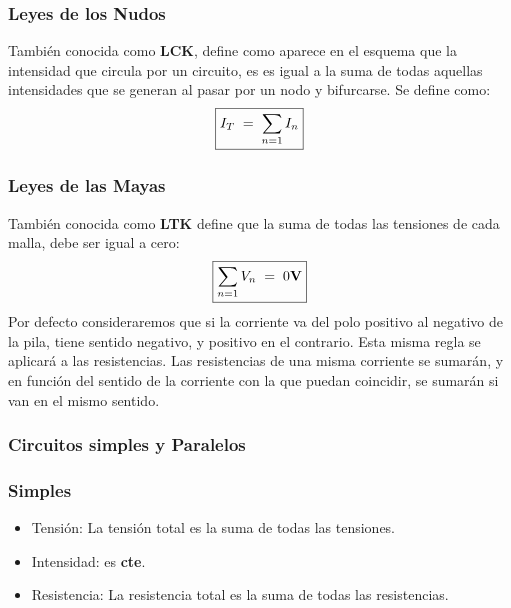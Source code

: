\subsubsection{Leyes de los Nudos}
\begin{wrapfigure}{r}{3cm}
\end{wrapfigure}
\noindent También conocida como \textbf{LCK}, define como aparece en el esquema que la intensidad que circula por un circuito, es es igual a la suma de todas aquellas intensidades que se generan al pasar por un nodo y bifurcarse. Se define como:
\[
        \boxed{I_T \hspace{1mm} = \hspace{1mm} \sum_{n=1}I_n}
\]
\subsubsection{Leyes de las Mayas}
\noindent También conocida como \textbf{LTK} define que la suma de todas las tensiones de cada malla, debe ser igual a cero:
\[
        \boxed{\sum_{n=1}V_n \hspace{1mm} = \hspace{1mm} 0\textnormal{\textbf{V}}}
\]
\noindent Por defecto consideraremos que si la corriente va del polo positivo al negativo de la pila, tiene sentido negativo, y positivo en el contrario. Esta misma regla se aplicará a las resistencias.
Las resistencias de una misma corriente se sumarán, y en función del sentido de la corriente con la que puedan coincidir, se sumarán si van en el mismo sentido.
\subsubsection{Circuitos simples y Paralelos}
\subsubsection{Simples}
\begin{itemize}
        \item Tensión: La tensión total es la suma de todas las tensiones.
        \item Intensidad: es \textbf{cte}.
        \item Resistencia: La resistencia total es la suma de todas las resistencias.
\end{itemize}
